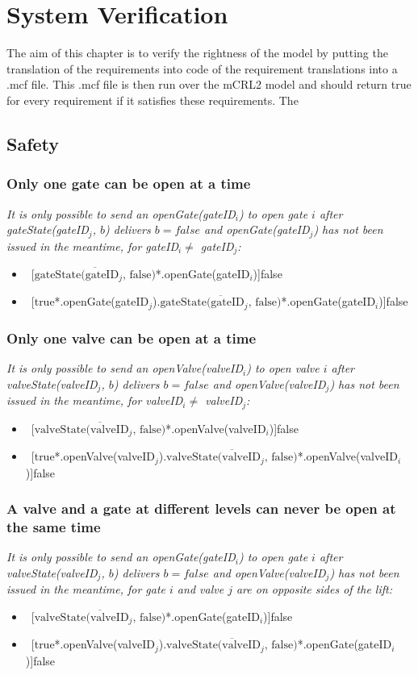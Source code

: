 \section{System Verification}
The aim of this chapter is to verify the rightness of the model by putting the translation of the requirements into code of the requirement translations into a .mcf file. This .mcf file is then run over the mCRL2 model and should return true for every requirement if it satisfies these requirements. The 
\subsection{Safety}
\subsubsection{Only one gate can be open at a time}
\textit{It is only possible to send an openGate(gateID$_i$) to open gate $i$ after gateState(gateID$_j$, $ b $) delivers $b = false$ and openGate(gateID$_j$) has not been issued in the meantime, for gateID$_i \neq$ gateID$_j$:}
\begin{itemize}
	\item ~[$\overline{\textrm{gateState(gateID$_j$, false)}}$*.openGate(gateID$_i$)]false
	\item ~[true*.openGate(gateID$_j$).$\overline{\textrm{gateState(gateID$_j$, false)}}$*.openGate(gateID$_i$)]false
\end{itemize}	

\subsubsection{Only one valve can be open at a time}
\textit{It is only possible to send an openValve(valveID$_i$) to open valve $i$ after valveState(valveID$_j$, $ b $) delivers $b = false$ and openValve(valveID$_j$) has not been issued in the meantime, for valveID$_i \neq$ valveID$_j$:}
\begin{itemize}
	\item ~[$\overline{\textrm{valveState(valveID$_j$, false)}}$*.openValve(valveID$_i$)]false
	\item ~[true*.openValve(valveID$_j$).$\overline{\textrm{valveState(valveID$_j$, false)}}$*.openValve(valveID$_i$)]false
\end{itemize}

\subsubsection{A valve and a gate at different levels can never be open at the same time}
\textit{It is only possible to send an openGate(gateID$_i$) to open gate $i$ after valveState(valveID$_j$, $ b $) delivers $b = false$ and openValve(valveID$_j$) has not been issued in the meantime, for gate $i$ and valve $j$ are on opposite sides of the lift:}
\begin{itemize}
	\item ~[$\overline{\textrm{valveState(valveID$_j$, false)}}$*.openGate(gateID$_i$)]false
	\item ~[true*.openValve(valveID$_j$).$\overline{\textrm{valveState(valveID$_j$, false)}}$*.openGate(gateID$_i$)]false
\end{itemize}

